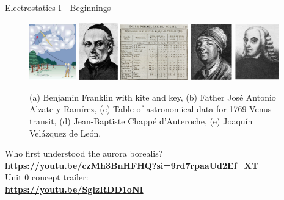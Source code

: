 \documentclass{beamer}
\begin{document}
\begin{frame}{Electrostatics I - Beginnings}
\small
\begin{figure}
\centering
\includegraphics[width=0.18\textwidth]{figures/franklin.png}
\includegraphics[width=0.15\textwidth]{figures/alzate_ramirez.jpg}
\includegraphics[width=0.26\textwidth]{figures/1769_transit.png}
\includegraphics[width=0.16\textwidth]{figures/Abbot_dAuteroche.png}
\includegraphics[width=0.17\textwidth]{figures/joaquin_v_d_Leon.png}
\caption{\label{fig:franklin} (a) Benjamin Franklin with kite and key, (b) Father Jos\'{e} Antonio Alzate y Ram\'{i}rez, (c) Table of astronomical data for 1769 Venus transit, (d) Jean-Baptiste Chapp\'{e} d'Auteroche, (e) Joaqu\'{i}n Vel\'{a}zquez de Le\'{o}n.}
\end{figure}
Who first understood the aurora borealis?
\textbf{\alert{\url{https://youtu.be/czMh3BnHFHQ?si=9rd7rpaaUd2Ef_XT}}} \\ \vspace{0.5cm}
Unit 0 concept trailer: \\
\textbf{\alert{\url{https://youtu.be/SglzRDD1oNI}}}
\end{frame}
\end{document}
